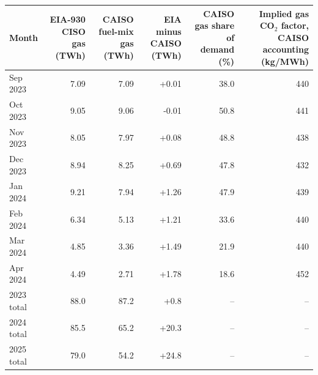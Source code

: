 \begin{tabular}{lrrrrr}
\toprule
Month & EIA-930 CISO gas (TWh) & CAISO fuel-mix gas (TWh) & EIA minus CAISO (TWh) & CAISO gas share of demand (\%) & Implied gas CO$_2$ factor, CAISO accounting (kg/MWh) \\
\midrule
Sep 2023 & 7.09 & 7.09 & +0.01 & 38.0 & 440 \\
Oct 2023 & 9.05 & 9.06 & -0.01 & 50.8 & 441 \\
Nov 2023 & 8.05 & 7.97 & +0.08 & 48.8 & 438 \\
Dec 2023 & 8.94 & 8.25 & +0.69 & 47.8 & 432 \\
Jan 2024 & 9.21 & 7.94 & +1.26 & 47.9 & 439 \\
Feb 2024 & 6.34 & 5.13 & +1.21 & 33.6 & 440 \\
Mar 2024 & 4.85 & 3.36 & +1.49 & 21.9 & 440 \\
Apr 2024 & 4.49 & 2.71 & +1.78 & 18.6 & 452 \\
\midrule
2023 total & 88.0 & 87.2 & +0.8 & -- & -- \\
2024 total & 85.5 & 65.2 & +20.3 & -- & -- \\
2025 total & 79.0 & 54.2 & +24.8 & -- & -- \\
\bottomrule
\end{tabular}